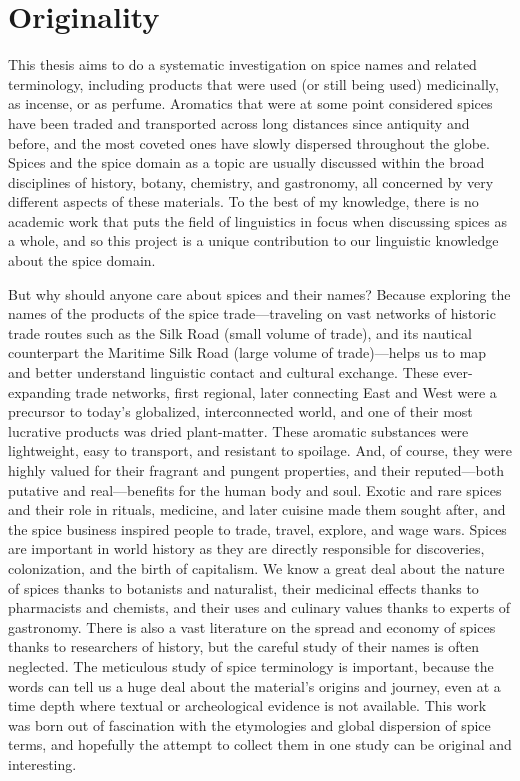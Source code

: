\section{Originality}

This thesis aims to do a systematic investigation on spice names and related terminology, including products that were used (or still being used) medicinally, as incense, or as perfume. Aromatics that were at some point considered spices have been traded and transported across long distances since antiquity and before, and the most coveted ones have slowly dispersed throughout the globe. Spices and the spice domain as a topic are usually discussed within the broad disciplines of history, botany, chemistry, and gastronomy, all concerned by very different aspects of these materials. To the best of my knowledge, there is no academic work that puts the field of linguistics in focus when discussing spices as a whole, and so this project is a unique contribution to our linguistic knowledge about the spice domain.

But why should anyone care about spices and their names? Because exploring the names of the products of the spice trade---traveling on vast networks of historic trade routes such as the Silk Road (small volume of trade), and its nautical counterpart the Maritime Silk Road (large volume of trade)---helps us to map and better understand linguistic contact and cultural exchange. These ever-expanding trade networks, first regional, later connecting East and West were a precursor to today's globalized, interconnected world, and one of their most lucrative products was dried plant-matter. These aromatic substances were lightweight, easy to transport, and resistant to spoilage. And, of course, they were highly valued for their fragrant and pungent properties, and their reputed---both putative and real---benefits for the human body and soul. Exotic and rare spices and their role in rituals, medicine, and later cuisine made them sought after, and the spice business inspired people to trade, travel, explore, and wage wars. Spices are important in world history as they are directly responsible for discoveries, colonization, and the birth of capitalism. We know a great deal about the nature of spices thanks to botanists and naturalist, their medicinal effects thanks to pharmacists and chemists, and their uses and culinary values thanks to experts of gastronomy. There is also a vast literature on the spread and economy of spices thanks to researchers of history, but the careful study of their names is often neglected. The meticulous study of spice terminology is important, because the words can tell us a huge deal about the material's origins and journey, even at a time depth where textual or archeological evidence is not available. This work was born out of fascination with the etymologies and global dispersion of spice terms, and hopefully the attempt to collect them in one study can be original and interesting.

